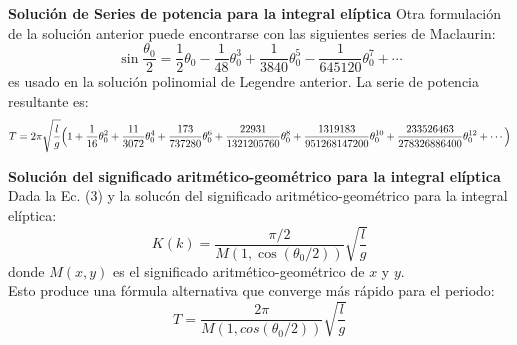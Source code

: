 \documentclass[12pt]{article}
\begin{document}
\textbf{Solución de Series de potencia para la integral elíptica}
Otra formulación de la solución anterior puede encontrarse con las siguientes series de Maclaurin:
$$\sin\frac{\theta_0}{2}=\frac{1}{2}\theta_0-\frac{1}{48}\theta_0^3+\frac{1}{3840}\theta_0^5-\frac{1}{645120}\theta_0^7+\cdots$$
es usado en la solución polinomial de Legendre anterior. La serie de potencia resultante es:
$$T=2\pi\sqrt{\frac{l}{g}}\Bigl(1+\frac{1}{16}\theta_0^2+\frac{11}{3072}\theta_0^4+\frac{173}{737280}\theta_0^6+\frac{22931}{1321205760}\theta_0^8+\frac{1319183}{951268147200}\theta_0^{10}+\frac{233526463}{278326886400}\theta_0^{12}+\cdots\Bigl)$$

\textbf{Solución del significado aritmético-geométrico para la integral elíptica}
Dada la Ec. (3) y  la solucón del significado aritmético-geométrico para la integral elíptica:
$$K(k)=\frac{\pi/2}{M(1,\cos(\theta_0/2))}\sqrt{\frac{l}{g}}$$
donde $M(x,y)$ es el significado aritmético-geométrico de $x$ y $y$.\\
Esto produce una fórmula alternativa que converge más rápido para el periodo:
$$T=\frac{2\pi}{M(1,cos(\theta_0/2))}\sqrt{\frac{l}{g}}$$
\end{document}
